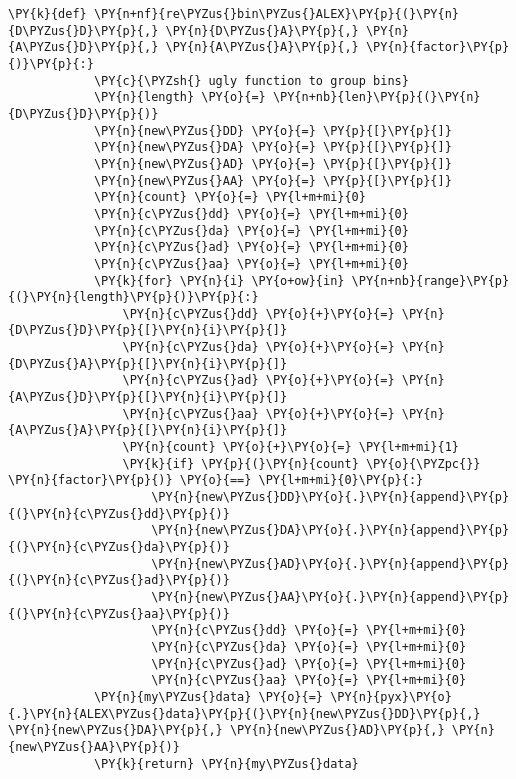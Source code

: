 \begin{Verbatim}[commandchars=\\\{\}, fontsize=\scriptsize]
            \PY{k}{def} \PY{n+nf}{re\PYZus{}bin\PYZus{}ALEX}\PY{p}{(}\PY{n}{D\PYZus{}D}\PY{p}{,} \PY{n}{D\PYZus{}A}\PY{p}{,} \PY{n}{A\PYZus{}D}\PY{p}{,} \PY{n}{A\PYZus{}A}\PY{p}{,} \PY{n}{factor}\PY{p}{)}\PY{p}{:}
            \PY{c}{\PYZsh{} ugly function to group bins}
            \PY{n}{length} \PY{o}{=} \PY{n+nb}{len}\PY{p}{(}\PY{n}{D\PYZus{}D}\PY{p}{)}
            \PY{n}{new\PYZus{}DD} \PY{o}{=} \PY{p}{[}\PY{p}{]}
            \PY{n}{new\PYZus{}DA} \PY{o}{=} \PY{p}{[}\PY{p}{]}
            \PY{n}{new\PYZus{}AD} \PY{o}{=} \PY{p}{[}\PY{p}{]}
            \PY{n}{new\PYZus{}AA} \PY{o}{=} \PY{p}{[}\PY{p}{]}
            \PY{n}{count} \PY{o}{=} \PY{l+m+mi}{0}
            \PY{n}{c\PYZus{}dd} \PY{o}{=} \PY{l+m+mi}{0}
            \PY{n}{c\PYZus{}da} \PY{o}{=} \PY{l+m+mi}{0}
            \PY{n}{c\PYZus{}ad} \PY{o}{=} \PY{l+m+mi}{0}
            \PY{n}{c\PYZus{}aa} \PY{o}{=} \PY{l+m+mi}{0}
            \PY{k}{for} \PY{n}{i} \PY{o+ow}{in} \PY{n+nb}{range}\PY{p}{(}\PY{n}{length}\PY{p}{)}\PY{p}{:}
                \PY{n}{c\PYZus{}dd} \PY{o}{+}\PY{o}{=} \PY{n}{D\PYZus{}D}\PY{p}{[}\PY{n}{i}\PY{p}{]}
                \PY{n}{c\PYZus{}da} \PY{o}{+}\PY{o}{=} \PY{n}{D\PYZus{}A}\PY{p}{[}\PY{n}{i}\PY{p}{]}
                \PY{n}{c\PYZus{}ad} \PY{o}{+}\PY{o}{=} \PY{n}{A\PYZus{}D}\PY{p}{[}\PY{n}{i}\PY{p}{]}
                \PY{n}{c\PYZus{}aa} \PY{o}{+}\PY{o}{=} \PY{n}{A\PYZus{}A}\PY{p}{[}\PY{n}{i}\PY{p}{]}
                \PY{n}{count} \PY{o}{+}\PY{o}{=} \PY{l+m+mi}{1}
                \PY{k}{if} \PY{p}{(}\PY{n}{count} \PY{o}{\PYZpc{}} \PY{n}{factor}\PY{p}{)} \PY{o}{==} \PY{l+m+mi}{0}\PY{p}{:}
                    \PY{n}{new\PYZus{}DD}\PY{o}{.}\PY{n}{append}\PY{p}{(}\PY{n}{c\PYZus{}dd}\PY{p}{)}
                    \PY{n}{new\PYZus{}DA}\PY{o}{.}\PY{n}{append}\PY{p}{(}\PY{n}{c\PYZus{}da}\PY{p}{)}
                    \PY{n}{new\PYZus{}AD}\PY{o}{.}\PY{n}{append}\PY{p}{(}\PY{n}{c\PYZus{}ad}\PY{p}{)}
                    \PY{n}{new\PYZus{}AA}\PY{o}{.}\PY{n}{append}\PY{p}{(}\PY{n}{c\PYZus{}aa}\PY{p}{)}
                    \PY{n}{c\PYZus{}dd} \PY{o}{=} \PY{l+m+mi}{0}
                    \PY{n}{c\PYZus{}da} \PY{o}{=} \PY{l+m+mi}{0}
                    \PY{n}{c\PYZus{}ad} \PY{o}{=} \PY{l+m+mi}{0}
                    \PY{n}{c\PYZus{}aa} \PY{o}{=} \PY{l+m+mi}{0}
            \PY{n}{my\PYZus{}data} \PY{o}{=} \PY{n}{pyx}\PY{o}{.}\PY{n}{ALEX\PYZus{}data}\PY{p}{(}\PY{n}{new\PYZus{}DD}\PY{p}{,} \PY{n}{new\PYZus{}DA}\PY{p}{,} \PY{n}{new\PYZus{}AD}\PY{p}{,} \PY{n}{new\PYZus{}AA}\PY{p}{)}
            \PY{k}{return} \PY{n}{my\PYZus{}data}


\end{Verbatim}
